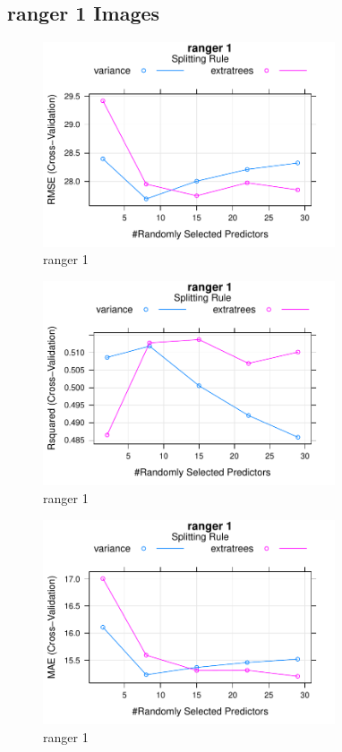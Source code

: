 
\subsection{ranger 1 Images} 
 

\begin{figure} 
\centering  
\includegraphics[width=0.77\textwidth]{Code_Outputs/ML_report_task_1ranger_RMSEvNVariables.pdf} 
\caption{\label{fig:ML_report_task_1rangerRMSEvNVariables}ranger 1} 
\end{figure} 
 

\begin{figure} 
\centering  
\includegraphics[width=0.77\textwidth]{Code_Outputs/ML_report_task_1ranger_RsquaredvNVariables.pdf} 
\caption{\label{fig:ML_report_task_1rangerRsquaredvNVariables}ranger 1} 
\end{figure} 
 

\begin{figure} 
\centering  
\includegraphics[width=0.77\textwidth]{Code_Outputs/ML_report_task_1ranger_MAEvNVariables.pdf} 
\caption{\label{fig:ML_report_task_1rangerMAEvNVariables}ranger 1} 
\end{figure} 
 
